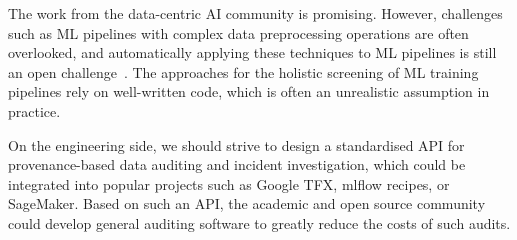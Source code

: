 The work from the data-centric AI community is promising. However, challenges such as ML pipelines with complex data preprocessing operations are often overlooked, and automatically applying these techniques to ML pipelines is still an open challenge~\cite{grafberger2023towards}. The approaches for the holistic screening of ML training pipelines rely on well-written code, which is often an unrealistic assumption in practice. 

On the engineering side, we should strive to design a standardised API for provenance-based data auditing and incident investigation, which could be integrated into popular projects such as Google TFX, mlflow recipes, or SageMaker. Based on such an API, the academic and open source community could develop general auditing software to greatly reduce the costs of such audits.

